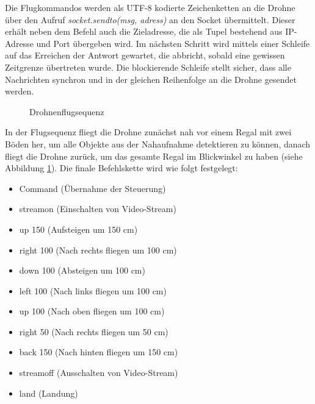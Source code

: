 Die Flugkommandos werden als UTF-8 kodierte Zeichenketten an die Drohne über den Aufruf \textit{socket.sendto(msg, adress)} an den Socket übermittelt. Dieser erhält neben dem Befehl auch die Zieladresse, die als Tupel bestehend aus IP-Adresse und Port übergeben wird. Im nächsten Schritt wird mittels einer Schleife auf das Erreichen der Antwort gewartet, die abbricht, sobald eine gewissen Zeitgrenze übertreten wurde. Die blockierende Schleife stellt sicher, dass alle Nachrichten synchron und in der gleichen Reihenfolge an die Drohne gesendet werden.

\begin{figure}[H]
	\caption[Drohnenflugsequenz]{Drohnenflugsequenz} 
	\label{sequenz}
\end{figure} 

In der Flugsequenz fliegt die Drohne zunächst nah vor einem Regal mit zwei Böden her, um alle Objekte aus der Nahaufnahme detektieren zu können, danach fliegt die Drohne zurück, um das gesamte Regal im Blickwinkel zu haben (siehe Abbildung \ref{sequenz}). Die finale Befehlskette wird wie folgt festgelegt:

\begin{itemize}
	\item Command (Übernahme der Steuerung)
	\item streamon (Einschalten von Video-Stream)
	\item up 150 (Aufsteigen um 150 cm)
	\item right 100 (Nach rechts fliegen um 100 cm)
	\item down 100 (Absteigen um 100 cm)
	\item left 100 (Nach links fliegen um 100 cm)
	\item up 100 (Nach oben fliegen um 100 cm)
	\item right 50 (Nach rechts fliegen um 50 cm)
	\item back 150 (Nach hinten fliegen um 150 cm)
	\item streamoff (Ausschalten von Video-Stream)
	\item land (Landung)
\end{itemize}

